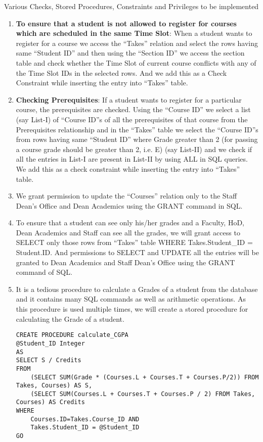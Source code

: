 \documentclass{beamer}
\begin{document}
\begin{frame}{Various Checks, Stored Procedures, Constraints and Privileges to be implemented}
\begin{enumerate}
\item {\bf To ensure that a student is not allowed to register for courses which are scheduled in the same Time Slot}: When a student wants to register for a course we access the ``Takes'' relation and select the rows having same ``Student ID'' and then using the ``Section ID'' we access the section table and check whether the Time Slot of current course conflicts with any of the Time Slot IDs in the selected rows. And we add this as a Check Constraint while inserting the entry into ``Takes'' table.

\item {\bf Checking Prerequisites}: If a student wants to register for a particular course, the prerequisites are checked. Using the ``Course ID'' we select a list (say List-I) of ``Course ID''s of all the prerequisites of that course from the Prerequisites relationship and in the ``Takes'' table we select the ``Course ID''s from rows having same ``Student ID'' where Grade greater than 2 (for passing a course grade should be greater than 2, i.e. E) (say List-II) and we check if all the entries in List-I are present in List-II by using ALL in SQL queries. We add this as a check constraint while inserting the entry into ``Takes'' table.

\item We grant permission to update the ``Courses'' relation only to the Staff Dean's Office and Dean Academics using the GRANT command in SQL.

\item To ensure that a student can see only his/her grades and a Faculty, HoD, Dean Academics and Staff can see all the grades, we will grant access to SELECT only those rows from ``Takes'' table WHERE Takes.Student\_ID = Student.ID. And permissions to SELECT and UPDATE all the entries will be granted to Dean Academics and Staff Dean's Office using the GRANT command of SQL.

\item It is a tedious procedure to calculate a Grades of a student from the database and it contains many SQL commands as well as arithmetic operations. As this procedure is used multiple times, we will create a stored procedure for calculating the Grade of a student.

\lstset{language=SQL,basicstyle=\ttfamily,numbers=left,numberstyle=\tiny}
\begin{lstlisting}[breaklines]
CREATE PROCEDURE calculate_CGPA
@Student_ID Integer
AS
SELECT S / Credits 
FROM 
	(SELECT SUM(Grade * (Courses.L + Courses.T + Courses.P/2)) FROM Takes, Courses) AS S,
	(SELECT SUM(Courses.L + Courses.T + Courses.P / 2) FROM Takes, Courses) AS Credits 
WHERE 
	Courses.ID=Takes.Course_ID AND 
	Takes.Student_ID = @Student_ID
GO
\end{lstlisting}


\end{enumerate}
\end{frame}
\end{document}
